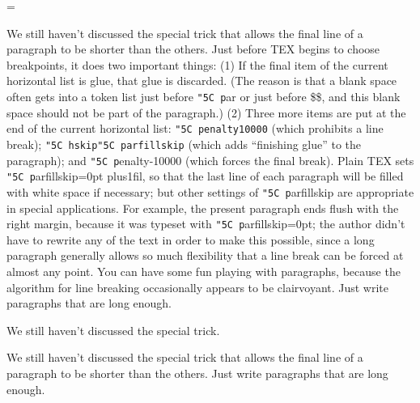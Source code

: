 \parfillskip=\parindent
\def\\#1{{\tt \char"5C #1}}

We still haven’t discussed the special trick that allows the final line of a
paragraph to be shorter than the others.
Just before TEX begins to choose
breakpoints, it does two important things: (1) If the final item of the current horizontal
list is glue, that glue is discarded. 
(The reason is that a blank space often gets into a
token list just before \\par or just before \$\$, 
and this blank space should not be part
of the paragraph.) 
(2) Three more items are put at the end of the current horizontal
list: \\{penalty10000} (which prohibits a line break); \\{hskip\\parfillskip} (which adds
“finishing glue” to the paragraph);
and \\penalty-10000 (which forces the final break).
Plain TEX sets \\parfillskip=0pt plus1fil,
so that the last line of each paragraph will
be filled with white space if necessary;
but other settings of \\parfillskip are appropriate in special applications.
For example, the present paragraph ends flush with the
right margin, because it was typeset with \\parfillskip=0pt; the author didn’t have to
rewrite any of the text in order to make this possible, since a long paragraph generally
allows so much flexibility that a line break can be forced at almost any point. You
can have some fun playing with paragraphs, because the algorithm for line breaking
occasionally appears to be clairvoyant. Just write paragraphs that are long enough.


We still haven’t discussed the special trick. 

We still haven’t discussed the special trick that allows the final line of a
paragraph to be shorter than the others.
Just write paragraphs that are long enough.

\bye

